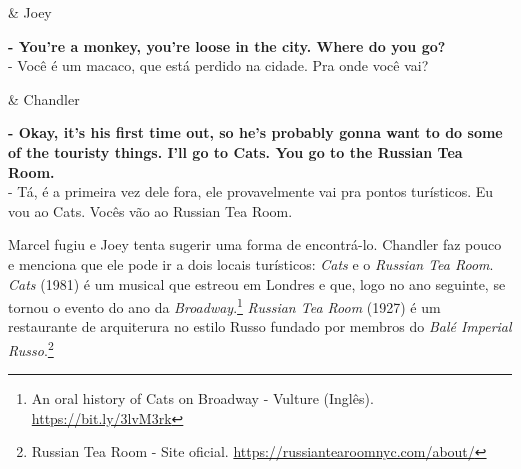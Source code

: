 \begin{tcolorbox}[enhanced,center upper,
    drop fuzzy shadow southeast, boxrule=0.3pt,
    lower separated=false, breakable,
    colframe=black!30!dialogoBorder,colback=white]
\begin{minipage}[c]{0.16\linewidth}
   & \centering \scriptsize{Joey}
\end{minipage}
\hfill
\begin{minipage}[c]{0.8\linewidth}
  \textbf{- You're a monkey, you're loose in the city. Where do you go?}\\
  - Você é um macaco, que está perdido na cidade. Pra onde você vai?
\end{minipage}

\medskip
\begin{minipage}[c]{0.16\linewidth}
   & \centering \scriptsize{Chandler}
\end{minipage}
\hfill
\begin{minipage}[c]{0.8\linewidth}
  \textbf{- Okay, it's his first time out, so he's probably gonna want to do some of the touristy things. I'll go to Cats. You go to the Russian Tea Room.}\\
  - Tá, é a primeira vez dele fora, ele provavelmente vai pra pontos turísticos. Eu vou ao Cats. Vocês vão ao Russian Tea Room.
\end{minipage}
\end{tcolorbox}

Marcel fugiu e Joey tenta sugerir uma forma de encontrá-lo. Chandler faz
pouco e menciona que ele pode ir a dois locais turísticos: \emph{Cats} e
o \emph{Russian Tea Room}. \emph{Cats} (1981) é um musical que estreou
em Londres e que, logo no ano seguinte, se tornou o evento do ano da
\emph{Broadway}.\footnote{\sloppy An oral history of Cats on Broadway - Vulture (Inglês). \url{https://bit.ly/3lvM3rk}}
\emph{Russian Tea Room} (1927) é um restaurante de arquiterura no estilo
Russo fundado por membros do \emph{Balé Imperial Russo}.\footnote{\sloppy Russian Tea Room - Site oficial. \url{https://russiantearoomnyc.com/about/}}

